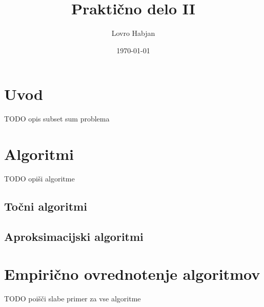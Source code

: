 \documentclass{article}
\title{Praktično delo II}
\author{Lovro Habjan}
\date{\today}
\begin{document}
\maketitle

\section{Uvod}

TODO opis subset sum problema

\section{Algoritmi}

TODO opiši algoritme

\subsection{Točni algoritmi}

\subsection{Aproksimacijski algoritmi}

\section{Empirično ovrednotenje algoritmov}

TODO poišči slabe primer za vse algoritme
\end{document}

